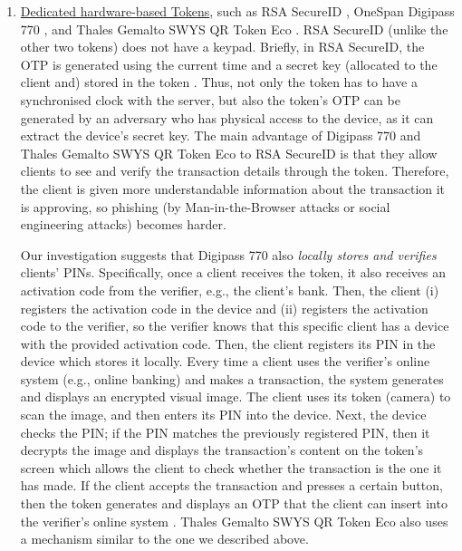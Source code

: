 \begin{enumerate}
\item \underline{Dedicated hardware-based Tokens}, such as RSA SecureID \cite{secureID}, OneSpan Digipass 770 \cite{Digipass-website}, and Thales Gemalto SWYS QR Token Eco \cite{Gemalto}.   RSA SecureID (unlike the other two tokens) does not have a keypad. Briefly, in RSA SecureID, the OTP is generated using the current time and a secret key (allocated to the client and) stored in the token \cite{biryukov2003cryptanalysis}. Thus, not only the token has to have a synchronised clock with the server, but also the token's OTP can be generated by an adversary who has physical access to the device, as it can extract the device's secret key.  The main advantage of  Digipass 770 and Thales Gemalto SWYS QR Token Eco to RSA SecureID is that they allow clients to see and verify the transaction details through the token. Therefore, the client is given more understandable information about the transaction it is approving,
so phishing (by Man-in-the-Browser attacks or social engineering attacks) becomes harder. 

 

Our investigation suggests that Digipass 770 also \emph{locally stores and verifies} clients' PINs. 
%
Specifically, once a client receives the token, it also receives an activation code from the verifier, e.g., the client's bank.  Then, the client (i) registers the activation code in the device and (ii) registers the activation code to the verifier, so the verifier knows that this specific client has a device with the provided activation code. Then, the client registers its PIN in the device which stores it locally. Every time a client uses the verifier's online system  (e.g., online banking) and makes a transaction, the system generates and displays an encrypted visual image. The client uses its token (camera) to scan the image, and then enters its PIN into the device. Next, the device checks the PIN; if the PIN matches the previously registered PIN, then it decrypts the image and displays the transaction's content on the token's screen which allows the client to check whether the transaction is the one it has made. If the client accepts the transaction and presses a certain button, then the token generates and displays an OTP that the client can insert into the verifier's online system \cite{Digipass-website,DIGIPASS-doc}.  Thales Gemalto SWYS QR Token Eco also uses a mechanism similar to the one we described above. 


\end{enumerate}
